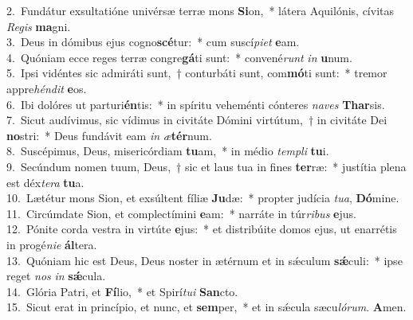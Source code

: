 {2.~}Fundátur exsultatióne univérsæ terræ mons \textbf{Si}on,~* látera Aquilónis, cívitas \textit{Re}\textit{gis} \textbf{ma}gni.\\
{3.~}Deus in dómibus ejus cogno\textbf{scé}tur:~* cum suscí\textit{pi}\textit{et} \textbf{e}am.\\
{4.~}Quóniam ecce reges terræ congre\textbf{gá}ti sunt:~* convené\textit{runt} \textit{in} \textbf{u}num.\\
{5.~}Ipsi vidéntes sic admiráti sunt,~† conturbáti sunt, com\textbf{mó}ti sunt:~* tremor appre\textit{hén}\textit{dit} \textbf{e}os.\\
{6.~}Ibi dolóres ut parturi\textbf{én}tis:~* in spíritu veheménti cónteres \textit{na}\textit{ves} \textbf{Thar}sis.\\
{7.~}Sicut audívimus, sic vídimus in civitáte Dómini virtútum,~† in civitáte Dei \textbf{no}stri:~* Deus fundávit eam \textit{in} \textit{æ}\textbf{tér}num.\\
{8.~}Suscépimus, Deus, misericórdiam \textbf{tu}am,~* in médio \textit{tem}\textit{pli} \textbf{tu}i.\\
{9.~}Secúndum nomen tuum, Deus,~† sic et laus tua in fines \textbf{ter}ræ:~* justítia plena est déx\textit{te}\textit{ra} \textbf{tu}a.\\
{10.~}Lætétur mons Sion, et exsúltent fíliæ \textbf{Ju}dæ:~* propter judícia \textit{tu}\textit{a}, \textbf{Dó}mine.\\
{11.~}Circúmdate Sion, et complectímini \textbf{e}am:~* narráte in túr\textit{ri}\textit{bus} \textbf{e}jus.\\
{12.~}Pónite corda vestra in virtúte \textbf{e}jus:~* et distribúite domos ejus, ut enarrétis in progé\textit{ni}\textit{e} \textbf{ál}tera.\\
{13.~}Quóniam hic est Deus, Deus noster in ætérnum et in sǽculum \textbf{sǽ}culi:~* ipse reget \textit{nos} \textit{in} \textbf{sǽ}cula.\\
{14.~}Glória Patri, et \textbf{Fí}lio,~* et Spirí\textit{tu}\textit{i} \textbf{San}cto.\\
{15.~}Sicut erat in princípio, et nunc, et \textbf{sem}per,~* et in sǽcula sæcu\textit{ló}\textit{rum}. \textbf{A}men.\\
